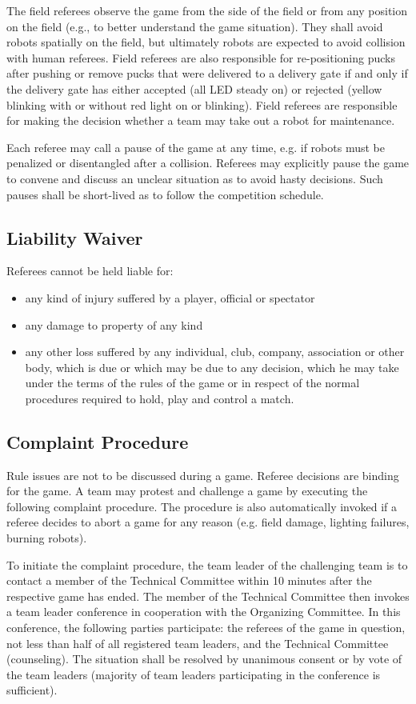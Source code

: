\documentclass[12pt,twoside]{article}
\begin{document}
The field referees observe the game from the side of the field or from
any position on the field (e.g., to better understand the game
situation). They shall avoid robots spatially on the field, but
ultimately robots are expected to avoid collision with human
referees. Field referees are also responsible for re-positioning pucks
after pushing or remove pucks that were delivered to a delivery gate
if and only if the delivery gate has either accepted (all LED steady
on) or rejected (yellow blinking with or without red light on or
blinking). Field referees are responsible for making the decision
whether a team may take out a robot for maintenance.

Each referee may call a pause of the game at any time, e.g. if robots
must be penalized or disentangled after a collision. Referees may
explicitly pause the game to convene and discuss an unclear situation
as to avoid hasty decisions. Such pauses shall be short-lived as to
follow the competition schedule. %

\subsection{Liability Waiver}
Referees cannot be held liable for:
\begin{itemize}
\item any kind of injury suffered by a player, official or spectator
\item any damage to property of any kind
\item any other loss suffered by any individual, club, company,
  association or other body, which is due or which may be due to any
  decision, which he may take under the terms of the rules of the game
  or in respect of the normal procedures required to hold, play and
  control a match.
\end{itemize}

\subsection{Complaint Procedure}
Rule issues are not to be discussed during a game. Referee decisions
are binding for the game. A team may protest and challenge a game by
executing the following complaint procedure. The procedure is also
automatically invoked if a referee decides to abort a game for any
reason (e.g. field damage, lighting failures, burning robots).

To initiate the complaint procedure, the team leader of the
challenging team is to contact a member of the Technical Committee
within 10 minutes after the respective game has ended. The member of
the Technical Committee then invokes a team leader conference in
cooperation with the Organizing Committee. In this conference, the
following parties participate: the referees of the game in question,
not less than half of all registered team leaders, and the Technical
Committee (counseling). The situation shall be resolved by unanimous
consent or by vote of the team leaders (majority of team leaders
participating in the conference is sufficient).
\end{document}
